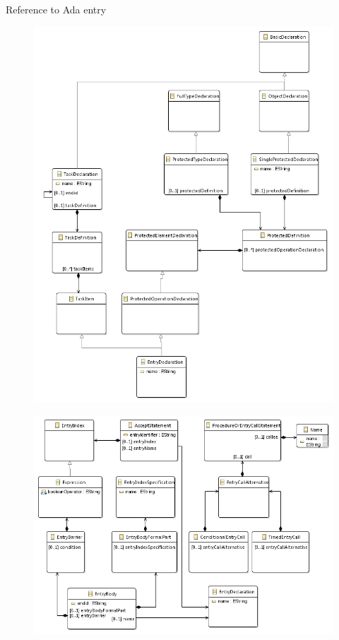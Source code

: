 \documentclass[a4paper]{prjdoc}
\begin{document}
  \begin{asection}{Reference to Ada entry}
     
     \begin{figure}
     \includegraphics[scale=0.78]{"../../model/Entry declaration"}
     \label{fig:Entry declaration}
     \end{figure}  
        
     \begin{figure}
     \includegraphics[scale=0.78]{"../../model/Entry call"}
     \label{fig:Entry call}
     \end{figure}
     

\end{asection}
\end{document}

